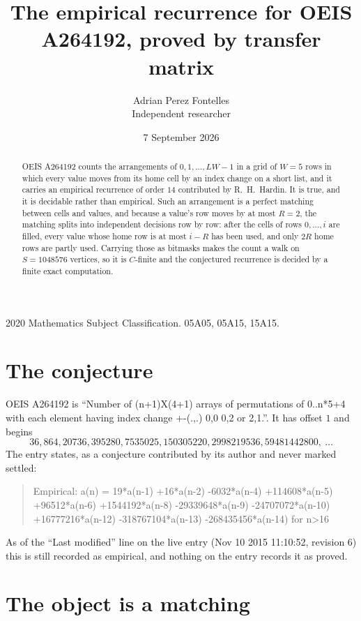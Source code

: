\documentclass[11pt,a4paper]{article}
\title{The empirical recurrence for OEIS A264192, proved by transfer matrix}
\author{Adrian Perez Fontelles\\ \small Independent researcher}
\date{7 September 2026}
\theoremstyle{plain}
\theoremstyle{definition}
\begin{document}
\maketitle

\begin{abstract}
OEIS A264192 counts the arrangements of $0,1,\dots,LW-1$ in a grid of $W=5$ rows in which
every value moves from its home cell by an index change on a short list, and it carries an
empirical recurrence of order $14$ contributed by R.~H.~Hardin. It is true, and it is
decidable rather than empirical. Such an arrangement is a perfect matching between cells and
values, and because a value's row moves by at most $R=2$, the matching splits into
independent decisions row by row: after the cells of rows $0,\dots,i$ are filled,
every value whose home row is at most $i-R$ has been used, and only $2R$ home rows are
partly used. Carrying those as bitmasks makes the count a walk on $S=1048576$ vertices, so it is
$C$-finite and the conjectured recurrence is decided by a finite exact computation.
\end{abstract}

\noindent\small 2020 Mathematics Subject Classification. 05A05, 05A15, 15A15.\normalsize

\section{The conjecture}

OEIS A264192 is ``Number of (n+1)X(4+1) arrays of permutations of 0..n*5+4 with each element having index change +-(.,.) 0,0 0,2 or 2,1.''. It has offset $1$ and begins
\[
36, 864, 20736, 395280, 7535025, 150305220, 2998219536, 59481442800,\ \dots
\]
The entry states, as a conjecture contributed by its author and never marked settled:
\begin{quote}
Empirical: a(n) = 19*a(n-1) +16*a(n-2) -6032*a(n-4) +114608*a(n-5) +96512*a(n-6) +1544192*a(n-8) -29339648*a(n-9) -24707072*a(n-10) +16777216*a(n-12) -318767104*a(n-13) -268435456*a(n-14) for n>16
\end{quote}
As of the ``Last modified'' line on the live entry (Nov 10 2015 11:10:52, revision 6) this is still
recorded as empirical, and nothing on the entry records it as proved.

\section{The object is a matching}
\end{document}

